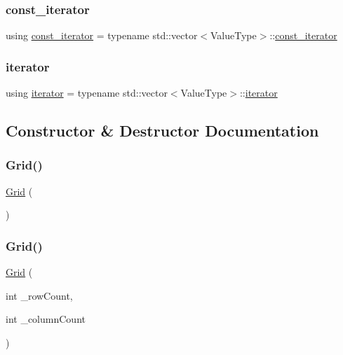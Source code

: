 \subsubsection{\texorpdfstring{const\+\_\+iterator}{const\_iterator}}
{\footnotesize\ttfamily using \mbox{\hyperlink{classGrid_aab30a5ff3fa2aff5b1f8b875438a3609}{const\+\_\+iterator}} =  typename std\+::vector$<$Value\+Type$>$\+::\mbox{\hyperlink{classGrid_aab30a5ff3fa2aff5b1f8b875438a3609}{const\+\_\+iterator}}}

\mbox{\label{classGrid_a438dbfd1a4dbef14e32131afd1bcb42f}} 
\subsubsection{\texorpdfstring{iterator}{iterator}}
{\footnotesize\ttfamily using \mbox{\hyperlink{classGrid_a438dbfd1a4dbef14e32131afd1bcb42f}{iterator}} =  typename std\+::vector$<$Value\+Type$>$\+::\mbox{\hyperlink{classGrid_a438dbfd1a4dbef14e32131afd1bcb42f}{iterator}}}



\subsection{Constructor \& Destructor Documentation}
\mbox{\label{classGrid_ac9458fbc282411d7bbf8806fe5a0b863}} 
\subsubsection{\texorpdfstring{Grid()}{Grid()}\hspace{0.1cm}{\footnotesize\ttfamily [1/4]}}
{\footnotesize\ttfamily \mbox{\hyperlink{classGrid}{Grid}} (\begin{DoxyParamCaption}{ }\end{DoxyParamCaption})\hspace{0.3cm}{\ttfamily [default]}}

\mbox{\label{classGrid_ab865eead452bcf3a84e25937153b7635}} 
\subsubsection{\texorpdfstring{Grid()}{Grid()}\hspace{0.1cm}{\footnotesize\ttfamily [2/4]}}
{\footnotesize\ttfamily \mbox{\hyperlink{classGrid}{Grid}} (\begin{DoxyParamCaption}\item[{int}]{\+\_\+row\+Count,  }\item[{int}]{\+\_\+column\+Count }\end{DoxyParamCaption})}

